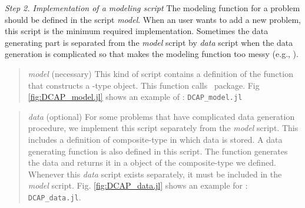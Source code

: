 \noindent\textit{Step 2. Implementation of a modeling script} The modeling function for a problem should be defined in the script \textit{model}. When an user wants to add a new problem, this script is the minimum required implementation. Sometimes the data generating part is separated from the \textit{model} script by \textit{data} script when the data generation is complicated so that makes the modeling function too messy (e.g., \suc).
\begin{quote}
	\noindent\textit{model} (necessary) This kind of script contains a definition of the function that constructs a \jumpmodel-type object. This function calls \structjump\ package. Fig \ref{fig:DCAP_model.jl} shows an example of \dcap: \texttt{DCAP\_model.jl}
\end{quote}
\begin{quote}
	\noindent\textit{data} (optional) For some problems that have complicated data generation procedure, we implement this script separately from the \textit{model} script. This includes a definition of composite-type in which data is stored. A data generating function is also defined in this script. The function generates the data and returns it in a object of the composite-type we defined. Whenever this \textit{data} script exists separately, it must be included in the \textit{model} script. Fig. \ref{fig:DCAP_data.jl} shows an example for \dcap: \texttt{DCAP\_data.jl}.
\end{quote}

%
%		
%	


